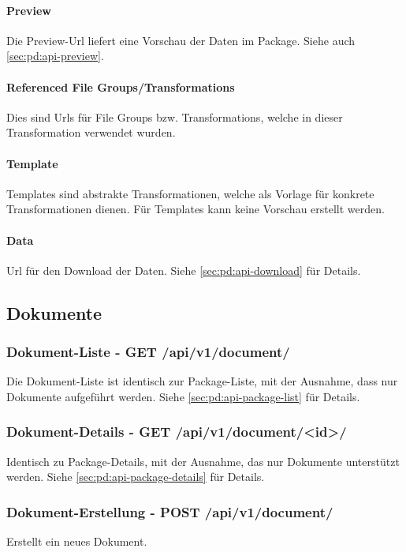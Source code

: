 \paragraph{Preview} Die Preview-Url liefert eine Vorschau der Daten im Package. Siehe auch \cref{sec:pd:api-preview}.

\paragraph{Referenced File Groups/Transformations} Dies sind Urls für File Groups bzw. Transformations, welche in dieser Transformation verwendet wurden.

\paragraph{Template} Templates sind abstrakte Transformationen, welche als Vorlage für konkrete Transformationen dienen. Für Templates kann keine Vorschau erstellt werden.

\paragraph{Data} Url für den Download der Daten. Siehe \cref{sec:pd:api-download} für Details.

\subsection{Dokumente}
\subsubsection{Dokument-Liste - GET /api/v1/document/}
Die Dokument-Liste ist identisch zur Package-Liste, mit der Ausnahme, dass nur Dokumente aufgeführt werden. Siehe \cref{sec:pd:api-package-list} für Details.

\subsubsection{Dokument-Details - GET /api/v1/document/<id>/} \label{sec:pd:api-document-details}
Identisch zu Package-Details, mit der Ausnahme, das nur Dokumente unterstützt werden. Siehe \cref{sec:pd:api-package-details} für Details.

\subsubsection{Dokument-Erstellung - POST /api/v1/document/}
Erstellt ein neues Dokument. 

